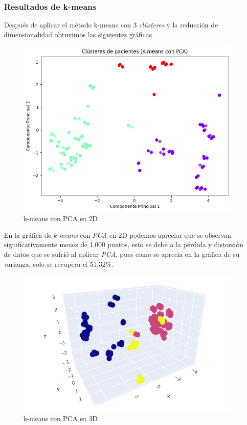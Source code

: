 \subsubsection{Resultados de k-means}

Después de aplicar el método k-means con 3 \textit{clústeres} y la reducción de dimensionalidad obtuvimos las siguientes gráficas

\begin{figure}[H]
    \centering
    \includegraphics[scale = 0.6]{Enrique/Imagenes/k-means-2d.png}
    \caption{k-means con PCA en 2D}
\end{figure}

En la gráfica de \textit{k-means} con \textit{PCA} en 2D podemos apreciar que se observan significativamente menos de 1,000 puntos, esto se debe a la pérdida y distorsión de datos que se sufrió al aplicar \textit{PCA}, pues como se aprecia en la gráfica de su varianza, solo se recupera el 51.32\%. 

\begin{figure}[H]
    \centering
    \includegraphics[scale = 0.6]{Enrique/Imagenes/k-means-3d.png}
    \caption{k-means con PCA en 3D}
\end{figure}

